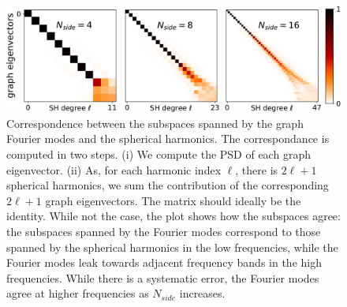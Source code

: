 \documentclass{article} %
\newcommand{\figref}[1]{Figure~\ref{fig:#1}}
\renewcommand{\b}[1]{{\bm{#1}}}   %
\newcommand{\1}{\b{1}}              %
\newcommand{\0}{\b{0}}              %
\begin{document}
\begin{figure}[ht!]
	\centering
	\includegraphics[width=0.9\linewidth]{subspace_harmonics_eigenvectors_v2}
	\caption{Correspondence between the subspaces spanned by the graph Fourier modes and the spherical harmonics.
		The correspondance is computed in two steps. (i) We compute the PSD of each graph eigenvector.
		(ii) As, for each harmonic index $\ell$, there is $2\ell+1$ spherical harmonics, we sum the contribution of the corresponding $2\ell+1$ graph eigenvectors.
		The matrix should ideally be the identity.
		While not the case, the plot shows how the subspaces agree: the subspaces spanned by the Fourier modes correspond to those spanned by the spherical harmonics in the low frequencies, while the Fourier modes leak towards adjacent frequency bands in the high frequencies.
		While there is a systematic error, the Fourier modes agree at higher frequencies as $N_{side}$ increases.}
		\label{fig:subspace_harmonics_eigenvectors}
\end{figure}
\end{document}
